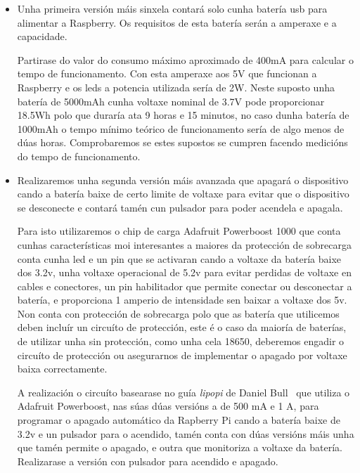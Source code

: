 \begin{itemize}
    \item Unha primeira versión máis sinxela contará solo cunha batería usb para alimentar a Raspberry. Os requisitos de esta batería serán a amperaxe e a capacidade.

    Partirase do valor do consumo máximo aproximado de 400mA para calcular o tempo de funcionamento. Con esta amperaxe aos 5V que funcionan a Raspberry e os leds a potencia utilizada sería de 2W. Neste suposto unha batería de  5000mAh cunha voltaxe nominal de 3.7V pode proporcionar 18.5Wh polo que duraría ata 9 horas e 15 minutos, no caso dunha batería de 1000mAh o tempo mínimo teórico de funcionamento sería de algo menos de dúas horas.
    Comprobaremos se estes supostos se cumpren facendo medicións do tempo de funcionamento.

    \item Realizaremos unha segunda versión máis avanzada que apagará o dispositivo cando a batería baixe de certo limite de voltaxe para evitar que o dispositivo se desconecte e contará tamén cun pulsador para poder acendela e apagala.

    Para isto utilizaremos o chip de carga Adafruit Powerboost 1000 que conta cunhas características moi interesantes a maiores da protección de sobrecarga conta cunha led e un pin que se activaran cando a voltaxe da batería baixe dos 3.2v, unha voltaxe operacional de 5.2v para evitar perdidas de voltaxe en cables e conectores, un pin habilitador que permite conectar ou desconectar a batería, e proporciona 1 amperio de intensidade sen baixar a voltaxe dos 5v. Non conta con protección de sobrecarga polo que as batería que utilicemos deben incluír un circuíto de protección, este é o caso da maioría de baterías, de utilizar unha sin protección, como unha cela 18650, deberemos engadir o circuíto de protección ou asegurarnos de implementar o apagado por voltaxe baixa correctamente.

    A realización o circuíto basearase no guía \emph{lipopi} de Daniel Bull~\cite{bullGuideSettingLiPo2019} que utiliza o Adafruit Powerboost, nas súas dúas versións a de 500 mA e 1 A, para programar o apagado automático da Rapberry Pi cando a batería baixe de 3.2v e un pulsador para o acendido, tamén conta con dúas versións máis unha que tamén permite o apagado, e outra que monitoriza a voltaxe da batería. Realizarase a versión con pulsador para acendido e apagado.


\end{itemize}
